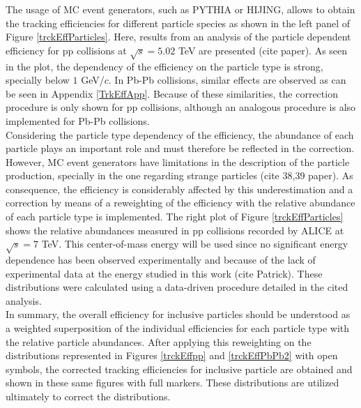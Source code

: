 \documentclass[12pt,a4paper]{report}
\begin{document}
The usage of MC event generators, such as PYTHIA or HIJING, allows to obtain the tracking efficiencies for different particle species as shown in the left panel of Figure \ref{trckEffParticles}. Here, results from  an analysis of the particle dependent efficiency for pp collisions at $\sqrt{s} = 5.02$ TeV are presented (cite paper). As seen in the plot, the dependency of the efficiency on the particle type is strong, specially below $1$ GeV/$c$. In Pb-Pb collisions, similar effects are observed as can be seen in Appendix \ref{TrkEffApp}. Because of these similarities, the correction procedure is only shown for pp collisions, although an analogous procedure is also implemented for Pb-Pb collisions.\\
Considering the particle type dependency of the efficiency, the abundance of each particle plays an important role and must therefore be reflected in the correction. However, MC event generators have limitations in the description of the particle production, specially in the one regarding strange particles (cite 38,39 paper). As consequence, the efficiency is considerably affected by this underestimation and a correction by means of a reweighting of the efficiency with the relative abundance of each particle type is implemented. The right plot of Figure \ref{trckEffParticles} shows the relative abundances measured in pp collisions recorded by ALICE at $\sqrt{s} = 7$ TeV. This center-of-mass energy will be used since no significant energy dependence has been observed experimentally and because of the lack of experimental data at the energy studied in this work (cite Patrick). These distributions were calculated using a data-driven procedure detailed in the cited analysis.\\
In summary, the overall efficiency for inclusive particles should be understood as a weighted superposition of the individual efficiencies for each particle type with the relative particle abundances. After applying this reweighting on the distributions represented in Figures \ref{trckEffpp} and \ref{trckEffPbPb2} with open symbols, the corrected tracking efficiencies for inclusive particle are obtained and shown in these same figures with full markers. These distributions are utilized ultimately to correct the \pt distributions. 
\end{document}
